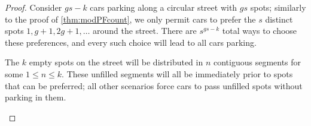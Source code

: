 \documentclass[12pt]{article}
\begin{document}
\begin{proof}
    Consider $gs-k$ cars parking along a circular street with $gs$ spots; similarly to the proof of \cref{thm:modPFcount}, we only permit cars to prefer the $s$ distinct spots $1,g+1,2g+1,\ldots$ around the street. There are $s^{gs-k}$ total ways to choose these preferences, and every such choice will lead to all cars parking.

    The $k$ empty spots on the street will be distributed in $n$ contiguous segments for some $1\le n\le k.$ These unfilled segments will all be immediately prior to spots that can be preferred; all other scenarios force cars to pass unfilled spots without parking in them.


\begin{figure}[h]
    \centering
\end{figure}
\end{proof}
\end{document}
